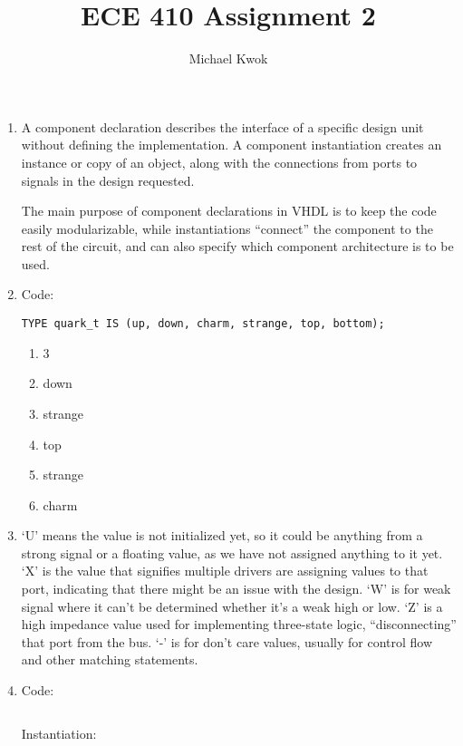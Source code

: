 \documentclass{article}
\title{ECE 410 Assignment 2}
\author{Michael Kwok}
\begin{document}
\maketitle
\begin{enumerate}
  \item A component declaration describes the interface of a specific design unit without defining the implementation.
        A component instantiation creates an instance or copy of an object, along with the connections from ports to signals in the design requested.

        The main purpose of component declarations in VHDL is to keep the code easily modularizable, while instantiations ``connect'' the component to the rest of the circuit, and can also specify which component architecture is to be used.


  \item Code:

        \begin{verbatim}
TYPE quark_t IS (up, down, charm, strange, top, bottom);
        \end{verbatim}

        \begin{enumerate}
          \item 3
          \item down
          \item strange
          \item top
          \item strange
          \item charm
        \end{enumerate}

  \item `U' means the value is not initialized yet, so it could be anything from a strong signal or a floating value, as we have not assigned anything to it yet. `X' is the value that signifies multiple drivers are assigning values to that port, indicating that there might be an issue with the design. `W' is for weak signal where it can't be determined whether it's a weak high or low. `Z' is a high impedance value used for implementing three-state logic, ``disconnecting'' that port from the bus. `-' is for don't care values, usually for control flow and other matching statements.

  \item Code:

        \inputminted{vhdl}{src/BarrelShifterGeneric.vhd}

        Instantiation:


\end{enumerate}
\end{document}
